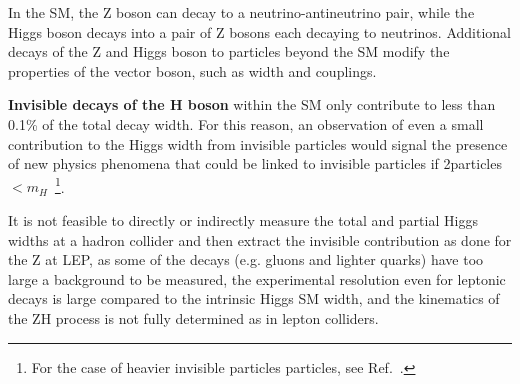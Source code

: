 In the SM, the Z boson can decay to a neutrino-antineutrino pair, while the Higgs boson decays into a pair of Z bosons each decaying to neutrinos. Additional decays of the Z and Higgs boson to particles beyond the SM modify the properties of the vector boson, such as width and couplings. 


\textbf{Invisible decays of the H boson} within the SM only contribute to less than 0.1\% of the total decay width. For this reason, an observation of even a small contribution to the Higgs width from invisible particles would signal the presence of new physics phenomena that could be linked to invisible particles if 2\minvisible particles $< m_H$~\footnote{For the case of heavier invisible particles particles, see Ref.~\cite{Djouadi:2011aa}.}. 



It is not feasible to directly or indirectly measure the total and partial Higgs widths at a hadron collider and then extract the invisible contribution as done for the Z at LEP, as some of the decays (e.g. gluons and lighter quarks) have too large a background to be measured, the experimental resolution even for leptonic decays is large compared to the intrinsic Higgs SM width, and the kinematics of the ZH process is not fully determined as in lepton colliders. %


